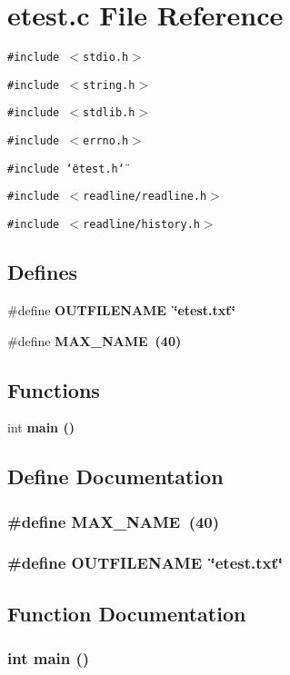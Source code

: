 \section{etest.c File Reference}
\label{etest_8c}
{\tt \#include $<$stdio.h$>$}\par
{\tt \#include $<$string.h$>$}\par
{\tt \#include $<$stdlib.h$>$}\par
{\tt \#include $<$errno.h$>$}\par
{\tt \#include \char`\"{}etest.h\char`\"{}}\par
{\tt \#include $<$readline/readline.h$>$}\par
{\tt \#include $<$readline/history.h$>$}\par
\subsection*{Defines}
\begin{CompactItemize}
\item 
\#define \bf{OUTFILENAME}~\char`\"{}etest.txt\char`\"{}
\item 
\#define \bf{MAX\_\-NAME}~(40)
\end{CompactItemize}
\subsection*{Functions}
\begin{CompactItemize}
\item 
int \bf{main} ()
\end{CompactItemize}


\subsection{Define Documentation}
\subsubsection{\setlength{\rightskip}{0pt plus 5cm}\#define MAX\_\-NAME~(40)}\label{etest_8c_c7c0207aa5a0e10d378be03b68041350}


\subsubsection{\setlength{\rightskip}{0pt plus 5cm}\#define OUTFILENAME~\char`\"{}etest.txt\char`\"{}}\label{etest_8c_b9366ad4235833c8da231456acc052f8}




\subsection{Function Documentation}
\subsubsection{\setlength{\rightskip}{0pt plus 5cm}int main ()}\label{etest_8c_e66f6b31b5ad750f1fe042a706a4e3d4}


